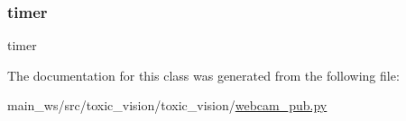 \subsubsection{\texorpdfstring{timer}{timer}}
{\footnotesize\ttfamily timer}



The documentation for this class was generated from the following file\+:\begin{DoxyCompactItemize}
\item 
main\+\_\+ws/src/toxic\+\_\+vision/toxic\+\_\+vision/\mbox{\hyperlink{webcam__pub_8py}{webcam\+\_\+pub.\+py}}\end{DoxyCompactItemize}
